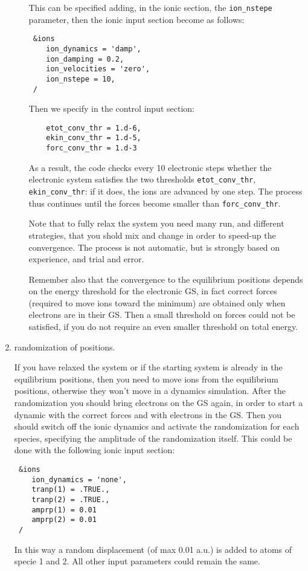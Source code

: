\documentclass[12pt,a4paper]{article}
\begin{document}
\begin{enumerate}
\begin{enumerate}
        This can be specified adding, in the ionic section, the
        \texttt{ion\_nstepe} parameter, then the ionic input section
        become as follows:
\begin{verbatim}
 &ions
    ion_dynamics = 'damp',
    ion_damping = 0.2,
    ion_velocities = 'zero',
    ion_nstepe = 10,
 /
\end{verbatim}
        Then we specify in the control input section:
\begin{verbatim}
    etot_conv_thr = 1.d-6,
    ekin_conv_thr = 1.d-5,
    forc_conv_thr = 1.d-3
\end{verbatim}
        As a result, the code checks every 10 electronic steps whether
        the electronic system satisfies the two thresholds
        \texttt{etot\_conv\_thr}, \texttt{ekin\_conv\_thr}: if it
        does, the ions are advanced by one step.
        The process thus continues until the forces become smaller
        than \texttt{forc\_conv\_thr}.

        Note that to fully relax the system you need many run, and
        different strategies, that you shold mix and change in order
        to speed-up the convergence.
        The process is not automatic, but is strongly based on
        experience, and trial and error.
     
        Remember also that the convergence to the equilibrium
        positions depends on the energy threshold for the electronic
        GS, in fact correct forces (required to move ions toward the
        minimum) are obtained only when electrons are in their GS.
        Then a small threshold on forces could not be satisfied, if
        you do not require an even smaller threshold on total energy.
    \end{enumerate}

  \item
    randomization of positions.

    If you have relaxed the system or if the starting system is
    already in the equilibrium positions, then you need to move ions
    from the equilibrium positions, otherwise they won't move in a
    dynamics simulation.
    After the randomization you should bring electrons on the GS
    again, in order to start a dynamic with the correct forces and
    with electrons in the GS.
    Then you should switch off the ionic dynamics and activate the
    randomization for each species, specifying the amplitude of the
    randomization itself.
    This could be done with the following ionic input section:
\begin{verbatim}
 &ions
    ion_dynamics = 'none',
    tranp(1) = .TRUE.,
    tranp(2) = .TRUE.,
    amprp(1) = 0.01
    amprp(2) = 0.01
 /
\end{verbatim}
    In this way a random displacement (of max 0.01 a.u.) is added to
    atoms of specie 1 and 2.
    All other input parameters could remain the same.


\end{enumerate}
\end{document}

